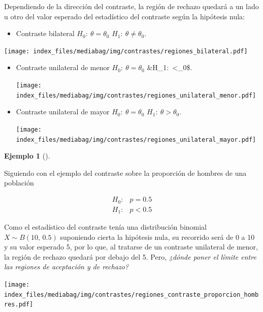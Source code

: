 \documentclass[
  a4paper,
]{scrreport}
\providecommand{\tightlist}{%
  \setlength{\itemsep}{0pt}\setlength{\parskip}{0pt}}\usepackage{longtable,booktabs,array}
\theoremstyle{plain}
\theoremstyle{definition}
\theoremstyle{definition}
\newtheorem{example}{Ejemplo}[chapter]
\theoremstyle{remark}
\begin{document}
Dependiendo de la dirección del contraste, la región de rechazo quedará
a un lado u otro del valor esperado del estadístico del contraste según
la hipótesis nula:

\begin{itemize}
\tightlist
\item
  Contraste bilateral \(H_0:\ \theta=\theta_0\)
  \(H_1:\ \theta\neq\theta_0\).
\end{itemize}

\begin{center}
\texttt{[image: index\_files/mediabag/img/contrastes/regiones\_bilateral.pdf]}
\end{center}

\begin{itemize}
\item
  Contraste unilateral de menor \(H_0:\ \theta=\theta_0\)
  \&H\_1:~\theta\textless{}\theta\_0\$. \begin{center}
  \texttt{[image: index\_files/mediabag/img/contrastes/regiones\_unilateral\_menor.pdf]}
  \end{center}
\item
  Contraste unilateral de mayor \(H_0:\ \theta=\theta_0\)
  \(H_1:\ \theta>\theta_0\). \begin{center}
  \texttt{[image: index\_files/mediabag/img/contrastes/regiones\_unilateral\_mayor.pdf]}
  \end{center}
\end{itemize}

\begin{example}[]\protect\hypertarget{exm-regiones-aceptacion-rechazo}{}\label{exm-regiones-aceptacion-rechazo}

Siguiendo con el ejemplo del contraste sobre la proporción de hombres de
una población

\begin{align*}
H_0: & p=0.5 \\
H_1: & p<0.5
\end{align*}

Como el estadístico del contraste tenía una distribución binomial
\(X\sim B(10,\,0.5)\) suponiendo cierta la hipótesis nula, su recorrido
será de 0 a 10 y su valor esperado 5, por lo que, al tratarse de un
contraste unilateral de menor, la región de rechazo quedará por debajo
del 5. Pero, \emph{¿dónde poner el límite entre las regiones de
aceptación y de rechazo?}

\begin{center}
\texttt{[image: index\_files/mediabag/img/contrastes/regiones\_contraste\_proporcion\_hombres.pdf]}
\end{center}

\end{example}
\end{document}
